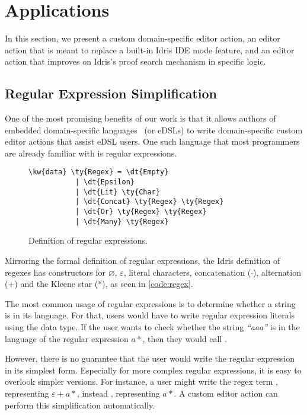 \section{Applications} \label{sec:applications}

In this section, we present a custom domain-specific editor action, an editor
action that is meant to replace a built-in Idris IDE mode feature, and an
editor action that improves on Idris's proof search mechanism in specific
logic.

\subsection{Regular Expression Simplification}

One of the most promising benefits of our work is that it allows authors of
embedded domain-specific languages~\cite{dsel} (or eDSLs) to write domain-specific
custom editor actions that assist eDSL users.
One such language that most programmers are already familiar with is regular
expressions.

\begin{figure}[H]
\begin{Verbatim}
\kw{data} \ty{Regex} = \dt{Empty}
           | \dt{Epsilon}
           | \dt{Lit} \ty{Char}
           | \dt{Concat} \ty{Regex} \ty{Regex}
           | \dt{Or} \ty{Regex} \ty{Regex}
           | \dt{Many} \ty{Regex}
\end{Verbatim}
\caption{Definition of regular expressions.}
\label{code:regex}
\end{figure}

Mirroring the formal definition of regular expressions, the Idris definition of
regexes has constructors for $\varnothing$, $\varepsilon$, literal
characters, concatenation ($\cdot$), alternation ($+$) and the Kleene star ($*$),
as seen in \autoref{code:regex}.

The most common usage of regular expressions is to determine whether a string is in its language.
For that, users would have to write regular expression literals using the
 data type. If the user wants to check whether the string \textit{``aaa''} is in
the language of the regular expression $a*$, then they would call
.

However, there is no guarantee that the user would write the regular expression
in its simplest form. Especially for more complex regular expressions, it is
easy to overlook simpler versions. For instance, a user might write the regex
term , representing
$\varepsilon + a*$, instead , representing $a*$.
A custom editor action can perform this simplification automatically.


